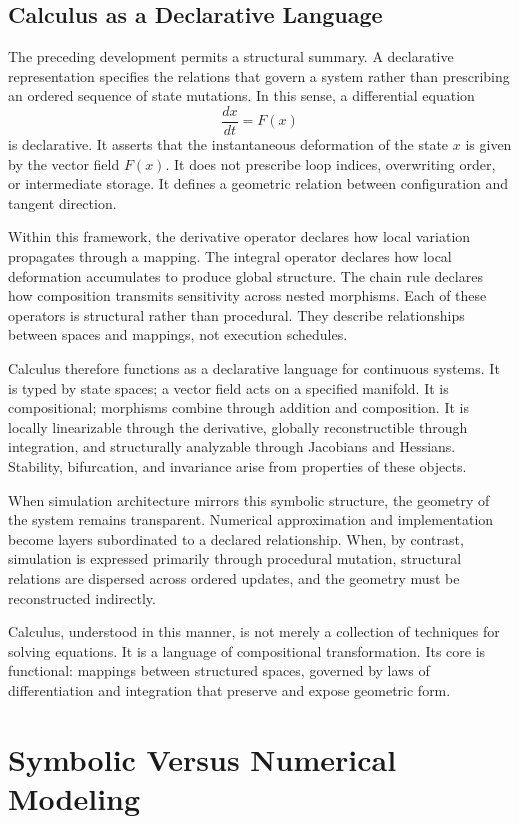 \documentclass[12pt]{book}
\begin{document}
\section{Calculus as a Declarative Language}

The preceding development permits a structural summary. A declarative
representation specifies the relations that govern a system rather
than prescribing an ordered sequence of state mutations. In this
sense, a differential equation
\[
\frac{dx}{dt} = F(x)
\]
is declarative. It asserts that the instantaneous deformation of the
state $x$ is given by the vector field $F(x)$. It does not prescribe
loop indices, overwriting order, or intermediate storage. It defines
a geometric relation between configuration and tangent direction.

Within this framework, the derivative operator declares how local
variation propagates through a mapping. The integral operator declares
how local deformation accumulates to produce global structure. The
chain rule declares how composition transmits sensitivity across nested
morphisms. Each of these operators is structural rather than
procedural. They describe relationships between spaces and mappings,
not execution schedules.

Calculus therefore functions as a declarative language for continuous
systems. It is typed by state spaces; a vector field acts on a
specified manifold. It is compositional; morphisms combine through
addition and composition. It is locally linearizable through the
derivative, globally reconstructible through integration, and
structurally analyzable through Jacobians and Hessians. Stability,
bifurcation, and invariance arise from properties of these objects.

When simulation architecture mirrors this symbolic structure, the
geometry of the system remains transparent. Numerical approximation
and implementation become layers subordinated to a declared
relationship. When, by contrast, simulation is expressed primarily
through procedural mutation, structural relations are dispersed across
ordered updates, and the geometry must be reconstructed indirectly.

Calculus, understood in this manner, is not merely a collection of
techniques for solving equations. It is a language of compositional
transformation. Its core is functional: mappings between structured
spaces, governed by laws of differentiation and integration that
preserve and expose geometric form.

\chapter{Symbolic Versus Numerical Modeling}
\end{document}
